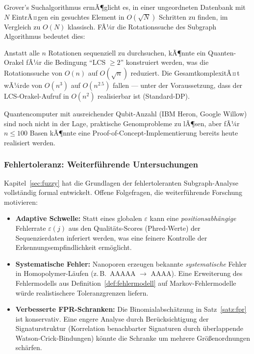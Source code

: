 ﻿\documentclass[a4paper,12pt]{article}
\theoremstyle{definition}
\begin{document}
Grover's Suchalgorithmus ermÃ¶glicht es, in einer ungeordneten Datenbank mit
$N$ EintrÃ¤gen ein gesuchtes Element in $O(\sqrt{N})$ Schritten zu finden,
im Vergleich zu $O(N)$ klassisch. FÃ¼r die Rotationssuche des Subgraph Algorithmus
bedeutet dies:

Anstatt alle $n$ Rotationen sequenziell zu durchsuchen, kÃ¶nnte ein
Quanten-Orakel fÃ¼r die Bedingung ``LCS $\geq 2$'' konstruiert werden, was die
Rotationssuche von $O(n)$ auf $O(\sqrt{n})$ reduziert. Die GesamtkomplexitÃ¤t
wÃ¼rde von $O(n^3)$ auf $O(n^{2.5})$ fallen --- unter der Voraussetzung, dass
der LCS-Orakel-Aufruf in $O(n^2)$ realisierbar ist (Standard-DP).

Quantencomputer mit ausreichender Qubit-Anzahl (IBM Heron, Google Willow)
sind noch nicht in der Lage, praktische Genomprobleme zu lÃ¶sen, aber fÃ¼r
$n \leq 100$ Basen kÃ¶nnte eine Proof-of-Concept-Implementierung bereits heute
realisiert werden.

\subsubsection{Fehlertoleranz: Weiterf\"{u}hrende Untersuchungen}

Kapitel~\ref{sec:fuzzy} hat die Grundlagen der fehlertoleranten Subgraph-Analyse
vollst\"{a}ndig formal entwickelt. Offene Folgefragen, die weiterf\"{u}hrende
Forschung motivieren:

\begin{itemize}
    \item \textbf{Adaptive Schwelle:} Statt eines globalen $\varepsilon$ kann
          eine \textit{positionsabh\"{a}ngige} Fehlerrate $\varepsilon(j)$ aus
          den Qualit\"{a}ts-Scores (Phred-Werte) der Sequenzierdaten inferiert
          werden, was eine feinere Kontrolle der Erkennungsempfindlichkeit
          erm\"{o}glicht.
    \item \textbf{Systematische Fehler:} Nanoporen erzeugen bekannte
          \textit{systematische} Fehler in Homopolymer-L\"{a}ufen
          (z.\,B.\ AAAAA $\to$ AAAA). Eine Erweiterung des Fehlermodells
          aus Definition~\ref{def:fehlermodell} auf Markov-Fehlermodelle
          w\"{u}rde realistischere Toleranzgrenzen liefern.
    \item \textbf{Verbesserte FPR-Schranken:} Die Binomialabsch\"{a}tzung
          in Satz~\ref{satz:fpr} ist konservativ. Eine engere Analyse durch
          Ber\"{u}cksichtigung der Signaturstruktur (Korrelation benachbarter
          Signaturen durch \"{u}berlappende Watson-Crick-Bindungen) k\"{o}nnte
          die Schranke um mehrere Gr\"{o}{\ss}enordnungen sch\"{a}rfen.
\end{itemize}
\end{document}
